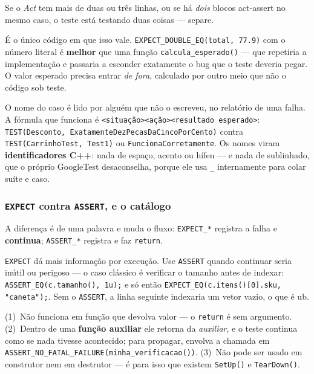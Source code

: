 Se o \emph{Act} tem mais de duas ou três linhas, ou se há \emph{dois} blocos
act-assert no mesmo caso, o teste está testando duas coisas --- separe.

\begin{regra}
É o único código em que isso vale. \texttt{EXPECT\_DOUBLE\_EQ(total, 77.9)} com o
número literal é \textbf{melhor} que uma função \texttt{calcula\_esperado()} ---
que repetiria a implementação e passaria a esconder exatamente o bug que o teste
deveria pegar. O valor esperado precisa entrar \emph{de fora}, calculado por
outro meio que não o código sob teste.
\end{regra}

O nome do caso é lido por alguém que não o escreveu, no relatório de uma falha. A
fórmula que funciona é \texttt{<situação><ação><resultado esperado>}:
\texttt{TEST(Desconto, ExatamenteDezPecasDaCincoPorCento)} contra
\texttt{TEST(CarrinhoTest, Test1)} ou \texttt{FuncionaCorretamente}. Os nomes
viram \textbf{identificadores C++}: nada de espaço, acento ou hífen --- e nada de
sublinhado, que o próprio GoogleTest desaconselha, porque ele usa \texttt{\_}
internamente para colar suíte e caso.

\subsubsection{\texttt{EXPECT} contra \texttt{ASSERT}, e o catálogo}

A diferença é de uma palavra e muda o fluxo: \texttt{EXPECT\_*} registra a falha e
\textbf{continua}; \texttt{ASSERT\_*} registra e faz \texttt{return}.

\begin{regra}
\texttt{EXPECT} dá mais informação por execução. Use \texttt{ASSERT} quando
continuar seria inútil ou perigoso --- o caso clássico é verificar o tamanho
antes de indexar: \texttt{ASSERT\_EQ(c.tamanho(), 1u);} e só então
\texttt{EXPECT\_EQ(c.itens()[0].sku, "caneta");}. Sem o \texttt{ASSERT}, a linha
seguinte indexaria um vetor vazio, o que é \gls{ub}.
\end{regra}

\begin{armadilha}
(1)~Não funciona em função que devolva valor --- o \texttt{return} é sem
argumento. (2)~Dentro de uma \textbf{função auxiliar} ele retorna da
\emph{auxiliar}, e o teste continua como se nada tivesse acontecido; para
propagar, envolva a chamada em
\texttt{ASSERT\_NO\_FATAL\_FAILURE(minha\_verificacao())}. (3)~Não pode ser usado
em construtor nem em destrutor --- é para isso que existem \texttt{SetUp()} e
\texttt{TearDown()}.
\end{armadilha}

